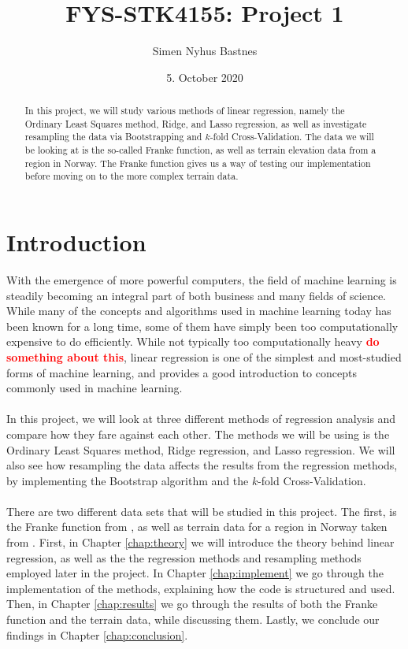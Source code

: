 \documentclass[a4paper]{article}
\title{FYS-STK4155: Project 1}
\author{Simen Nyhus Bastnes}
\date{5. October 2020}
\newcommand\red[1]{\textcolor{red}{\textbf{#1}}}
\begin{document}
\maketitle
\begin{abstract}
In this project, we will study various methods of linear regression, namely the Ordinary Least Squares method, Ridge, and Lasso regression, as well as investigate resampling the data via Bootstrapping and $k$-fold Cross-Validation. The data we will be looking at is the so-called Franke function, as well as terrain elevation data from a region in Norway. The Franke function gives us a way of testing our implementation before moving on to the more complex terrain data.%
\end{abstract}
\section{Introduction}

With the emergence of more powerful computers, the field of machine learning is steadily becoming an integral part of both business and many fields of science. While many of the concepts and algorithms used in machine learning today has been known for a long time, some of them have simply been too computationally expensive to do efficiently. While not typically too computationally heavy \red{do something about this}, linear regression is one of the simplest and most-studied forms of machine learning, and provides a good introduction to concepts commonly used in machine learning. 
\\\\
In this project, we will look at three different methods of regression analysis and compare how they fare against each other. The methods we will be using is the Ordinary Least Squares method, Ridge regression, and Lasso regression. We will also see how resampling the data affects the results from the regression methods, by implementing the Bootstrap algorithm and the $k$-fold Cross-Validation.
\\\\
There are two different data sets that will be studied in this project. The first, is the Franke function from \cite{Franke}, as well as terrain data for a region in Norway taken from \cite{terrain}. First, in Chapter \ref{chap:theory} we will introduce the theory behind linear regression, as well as the the regression methods and resampling methods employed later in the project. In Chapter \ref{chap:implement} we go through the implementation of the methods, explaining how the code is structured and used. Then, in Chapter \ref{chap:results} we go through the results of both the Franke function and the terrain data, while discussing them. %
Lastly, we conclude our findings in Chapter \ref{chap:conclusion}.
\end{document}
